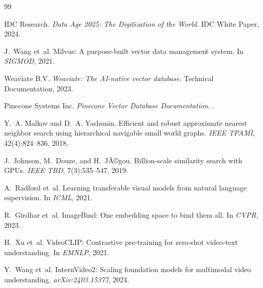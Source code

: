 ﻿\documentclass[12pt,a4paper]{article}
\begin{document}

\begin{thebibliography}{99}
\small

IDC Research.
\newblock \textit{Data Age 2025: The Digitization of the World}.
\newblock IDC White Paper, 2024.

J.~Wang et~al.
\newblock Milvus: A purpose-built vector data management system.
\newblock In \textit{SIGMOD}, 2021.

Weaviate B.V.
\newblock \textit{Weaviate: The AI-native vector database}.
\newblock Technical Documentation, 2023.

Pinecone Systems Inc.
\newblock \textit{Pinecone Vector Database Documentation}.
.

Y.~A. Malkov and D.~A. Yashunin.
\newblock Efficient and robust approximate nearest neighbor search using
  hierarchical navigable small world graphs.
\newblock \textit{IEEE TPAMI}, 42(4):824--836, 2018.

J.~Johnson, M.~Douze, and H.~JÃ©gou.
\newblock Billion-scale similarity search with GPUs.
\newblock \textit{IEEE TBD}, 7(3):535--547, 2019.

A.~Radford et~al.
\newblock Learning transferable visual models from natural language supervision.
\newblock In \textit{ICML}, 2021.

R.~Girdhar et~al.
\newblock ImageBind: One embedding space to bind them all.
\newblock In \textit{CVPR}, 2023.

H.~Xu et~al.
\newblock VideoCLIP: Contrastive pre-training for zero-shot video-text
  understanding.
\newblock In \textit{EMNLP}, 2021.

Y.~Wang et~al.
\newblock InternVideo2: Scaling foundation models for multimodal video
  understanding.
\newblock \textit{arXiv:2403.15377}, 2024.


\end{thebibliography}
\end{document}
